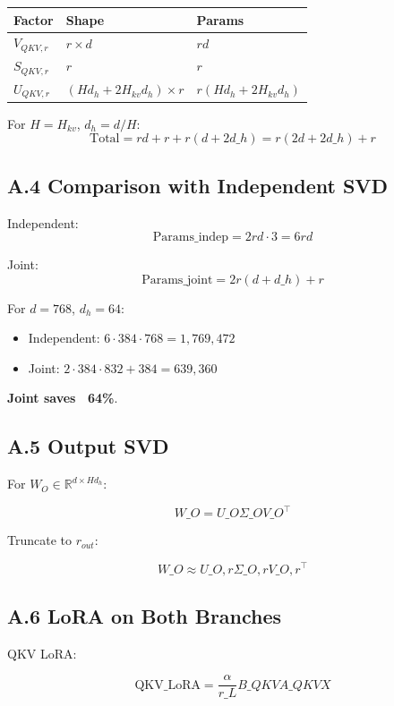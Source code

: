 \begin{table}[H]
\centering
\small
\begin{tabular}{lll}
\toprule
\textbf{Factor} & \textbf{Shape} & \textbf{Params} \\
\midrule
$V_{QKV, r}$ & $r \times d$ & $r d$ \\
$S_{QKV, r}$ & $r$ & $r$ \\
$U_{QKV, r}$ & $(H d_h + 2 H_{kv} d_h) \times r$ & $r (H d_h + 2 H_{kv} d_h)$ \\
\bottomrule
\end{tabular}
\end{table}

For $H = H_{kv}$, $d_h = d/H$:
\[
\text{Total} = r d + r + r (d + 2 d\_h) = r(2d + 2 d\_h) + r
\]

\subsection{A.4 Comparison with Independent SVD}

Independent:
\[
\text{Params}\_\text{indep} = 2 r d \cdot 3 = 6 r d
\]

Joint:
\[
\text{Params}\_\text{joint} = 2 r (d + d\_h) + r
\]

For $d = 768$, $d_h = 64$:
\begin{itemize}
\item Independent: $6 \cdot 384 \cdot 768 = 1,769,472$
\item Joint: $2 \cdot 384 \cdot 832 + 384 = 639,360$

\end{itemize}
\textbf{Joint saves ~64\%}.

\subsection{A.5 Output SVD}

For $W_O \in \mathbb{R}^{d \times H d_h}$:

\[
W\_O = U\_O \Sigma\_O V\_O^\top
\]

Truncate to $r_{out}$:

\[
W\_O \approx U\_{O, r} \Sigma\_{O, r} V\_{O, r}^\top
\]

\subsection{A.6 LoRA on Both Branches}

QKV LoRA:

\[
\text{QKV}\_\text{LoRA} = \frac{\alpha}{r\_L} B\_{QKV} A\_{QKV} X
\]

